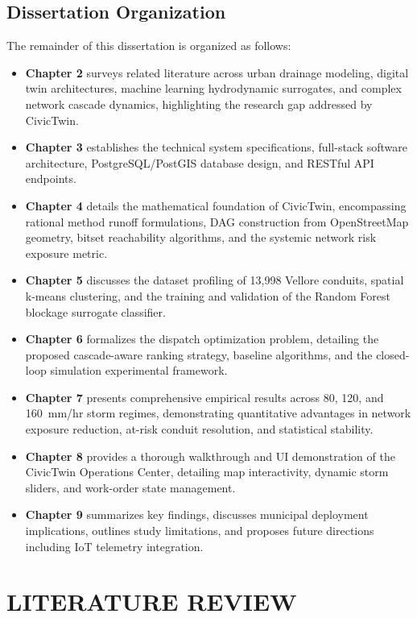 \documentclass[12pt,a4paper]{report}
\begin{document}
\section{Dissertation Organization}
The remainder of this dissertation is organized as follows:
\begin{itemize}
    \item \textbf{Chapter 2} surveys related literature across urban drainage modeling, digital twin architectures, machine learning hydrodynamic surrogates, and complex network cascade dynamics, highlighting the research gap addressed by CivicTwin.
    \item \textbf{Chapter 3} establishes the technical system specifications, full-stack software architecture, PostgreSQL/PostGIS database design, and RESTful API endpoints.
    \item \textbf{Chapter 4} details the mathematical foundation of CivicTwin, encompassing rational method runoff formulations, DAG construction from OpenStreetMap geometry, bitset reachability algorithms, and the systemic network risk exposure metric.
    \item \textbf{Chapter 5} discusses the dataset profiling of 13,998 Vellore conduits, spatial k-means clustering, and the training and validation of the Random Forest blockage surrogate classifier.
    \item \textbf{Chapter 6} formalizes the dispatch optimization problem, detailing the proposed cascade-aware ranking strategy, baseline algorithms, and the closed-loop simulation experimental framework.
    \item \textbf{Chapter 7} presents comprehensive empirical results across 80, 120, and 160~mm/hr storm regimes, demonstrating quantitative advantages in network exposure reduction, at-risk conduit resolution, and statistical stability.
    \item \textbf{Chapter 8} provides a thorough walkthrough and UI demonstration of the CivicTwin Operations Center, detailing map interactivity, dynamic storm sliders, and work-order state management.
    \item \textbf{Chapter 9} summarizes key findings, discusses municipal deployment implications, outlines study limitations, and proposes future directions including IoT telemetry integration.
\end{itemize}


\chapter{LITERATURE REVIEW}
\end{document}

